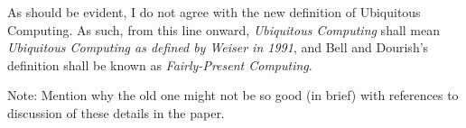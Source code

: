 As should be evident, I do not agree with the new definition of Ubiquitous Computing. As such, from this line onward,
\emph{Ubiquitous Computing} shall mean \emph{Ubiquitous Computing as defined by Weiser in 1991}, and Bell and Dourish's
definition shall be known as \emph{Fairly-Present Computing}.

Note: Mention why the old one might not be so good (in brief) with references to discussion of these details in the paper.